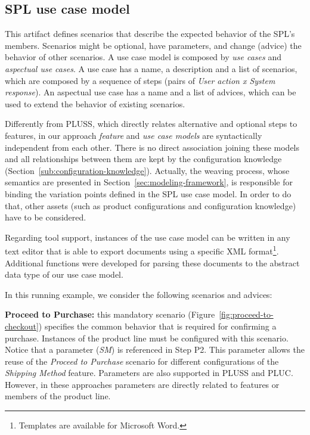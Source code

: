 \documentclass{sig-alternate}
\begin{document}
\subsection{SPL use case model}\label{sub:spl-uc}

This artifact defines scenarios that describe the expected behavior of the SPL's
members. Scenarios might be optional, have parameters, and change (advice) the
behavior of other scenarios. A use case model is composed by \emph{use cases} and
\emph{aspectual use cases}. A use case has a name, a description and a list of
scenarios, which are composed by a sequence of steps (pairs of \emph{User action x
System response}). An aspectual use case has a name and a list of advices, which
can be used to extend the behavior of existing scenarios.

Differently from PLUSS, which directly relates alternative and
optional steps to features, in our approach \emph{feature} and \emph{use case
models} are syntactically independent from each other. There is no direct
association joining these models and all relationships between them are kept by
the configuration knowledge (Section~\ref{sub:configuration-knowledge}).
 Actually, the weaving process, whose semantics are presented in
 Section~\ref{sec:modeling-framework}, is responsible for binding the variation
 points defined in the SPL use case model. In order to do that, other assets
 (such as product configurations and configuration knowledge) have to be
 considered.

Regarding tool support, instances of the use case model can
be written in any text editor that is able to export documents using a specific
XML format\footnote{Templates are available for Microsoft Word.}. Additional functions were
developed for parsing these documents to the abstract data type of our use case
model.

In this running example, we consider the following scenarios and advices:

{\bf Proceed to Purchase:} this mandatory scenario
(Figure~\ref{fig:proceed-to-checkout}) specifies the common behavior that is
required for confirming a purchase. Instances of the product line must be
configured with this scenario. 
Notice that a parameter (\emph{SM}) is referenced in Step P2. 
This parameter allows the reuse of the \emph{Proceed to
Purchase} scenario for different configurations of the \emph{Shipping Method} feature. Parameters 
are also supported in PLUSS and PLUC. However, in these approaches parameters are directly related to features or members of the product line.
\end{document}
